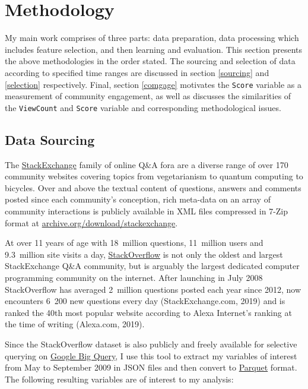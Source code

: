 \documentclass[11pt,preprint, authoryear]{article}
\begin{document}
\newpage

\section{\texorpdfstring{Methodology
\label{Method}}{Methodology }}\label{methodology}

My main work comprises of three parts: data preparation, data processing
which includes feature selection, and then learning and evaluation. This
section presents the above methodologies in the order stated. The
sourcing and selection of data according to specified time ranges are
discussed in section \ref{sourcing} and \ref{selection} respectively.
Final, section \ref{comgage} motivates the \texttt{Score} variable as a
measurement of community engagement, as well as discusses the
similarities of the \texttt{ViewCount} and \texttt{Score} variable and
corresponding methodological issues.

\subsection{\texorpdfstring{Data Sourcing
\label{sourcing}}{Data Sourcing }}\label{data-sourcing}

The \href{https://stackexchange.com/sites\#traffic}{StackExchange}
family of online Q\&A fora are a diverse range of over 170 community
websites covering topics from vegetarianism to quantum computing to
bicycles. Over and above the textual content of questions, answers and
comments posted since each community's conception, rich meta-data on an
array of community interactions is publicly available in XML files
compressed in 7-Zip format at
\href{http://archive.org/download/stackexchange}{archive.org/download/stackexchange}.

At over 11 years of age with 18~million questions, 11~million users and
9.3~million site visits a day,
\href{https://stackoverflow.com}{StackOverflow} is not only the oldest
and largest StackExchange Q\&A community, but is arguably the largest
dedicated computer programming community on the internet. After
launching in July 2008 StackOverflow has averaged 2~million questions
posted each year since 2012, now encounters 6~200 new questions every
day (StackExchange.com, 2019) and is ranked the 40th most popular
website according to Alexa Internet's ranking at the time of writing
(Alexa.com, 2019).

Since the StackOverflow dataset is also publicly and freely available
for selective querying on
\href{https://cloud.google.com/bigquery}{Google Big Query}, I use this
tool to extract my variables of interest from May to September 2009 in
JSON files and then convert to
\href{https://parquet.apache.org}{Parquet} format. The following
resulting variables are of interest to my analysis:
\end{document}
